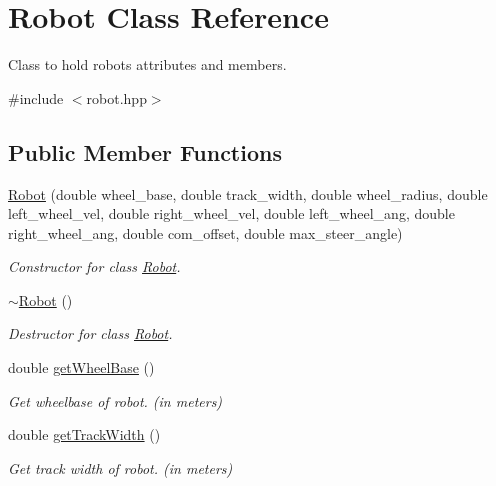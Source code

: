 \hypertarget{classRobot}{}\section{Robot Class Reference}
\label{classRobot}


Class to hold robot\textquotesingle{}s attributes and members.  




{\ttfamily \#include $<$robot.\+hpp$>$}

\subsection*{Public Member Functions}
\begin{DoxyCompactItemize}
\item 
\hyperlink{classRobot_a56b15a9c98244188ed610f62569a0aa0}{Robot} (double wheel\+\_\+base, double track\+\_\+width, double wheel\+\_\+radius, double left\+\_\+wheel\+\_\+vel, double right\+\_\+wheel\+\_\+vel, double left\+\_\+wheel\+\_\+ang, double right\+\_\+wheel\+\_\+ang, double com\+\_\+offset, double max\+\_\+steer\+\_\+angle)
\begin{DoxyCompactList}\small\item\em Constructor for class \hyperlink{classRobot}{Robot}. \end{DoxyCompactList}\item 
\mbox{\label{classRobot_a924320124b09c2f2ac1621aa210d5f38}} 
\hyperlink{classRobot_a924320124b09c2f2ac1621aa210d5f38}{$\sim$\+Robot} ()
\begin{DoxyCompactList}\small\item\em Destructor for class \hyperlink{classRobot}{Robot}. \end{DoxyCompactList}\item 
double \hyperlink{classRobot_a31e2ab259ea221e1143141ee7765a8e2}{get\+Wheel\+Base} ()
\begin{DoxyCompactList}\small\item\em Get wheelbase of robot. (in meters) \end{DoxyCompactList}\item 
double \hyperlink{classRobot_a4a8df828fb337ab4505f3513bd46f410}{get\+Track\+Width} ()
\begin{DoxyCompactList}\small\item\em Get track width of robot. (in meters) \end{DoxyCompactList}\item 

\end{DoxyCompactItemize}
